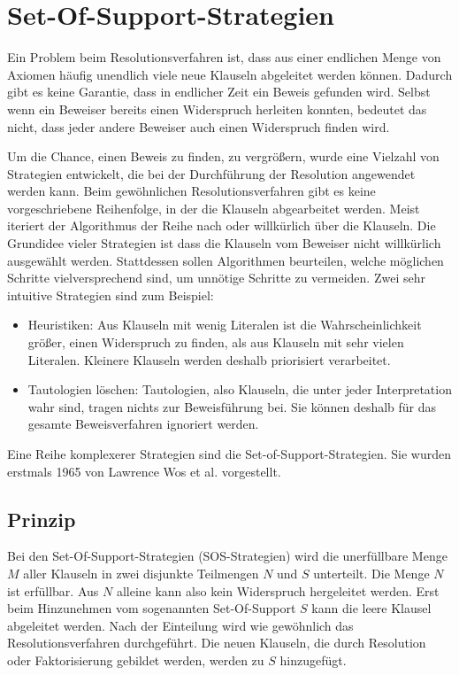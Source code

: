 	\section{Set-Of-Support-Strategien}
Ein Problem beim Resolutionsverfahren ist, dass aus einer endlichen Menge von Axiomen häufig unendlich viele neue Klauseln abgeleitet werden können. Dadurch gibt es keine Garantie, dass in endlicher Zeit ein Beweis gefunden wird. Selbst wenn ein Beweiser bereits einen Widerspruch herleiten konnten, bedeutet das nicht, dass jeder andere Beweiser auch einen Widerspruch finden wird.

Um die Chance, einen Beweis zu finden, zu vergrößern, wurde eine Vielzahl von Strategien entwickelt, die bei der Durchführung der Resolution angewendet werden kann. Beim gewöhnlichen Resolutionsverfahren gibt es keine vorgeschriebene Reihenfolge, in der die Klauseln abgearbeitet werden. Meist iteriert der Algorithmus der Reihe nach oder willkürlich über die Klauseln. Die Grundidee vieler Strategien ist dass die Klauseln vom Beweiser nicht willkürlich ausgewählt werden. Stattdessen sollen Algorithmen beurteilen, welche möglichen Schritte vielversprechend sind, um unnötige Schritte zu vermeiden. Zwei sehr intuitive Strategien sind zum Beispiel:
\begin{itemize}
	\item Heuristiken: Aus Klauseln mit wenig Literalen ist die Wahrscheinlichkeit größer, einen Widerspruch zu finden, als aus Klauseln mit sehr vielen Literalen. Kleinere Klauseln werden deshalb priorisiert verarbeitet.
	\item Tautologien löschen: Tautologien, also Klauseln, die unter jeder Interpretation wahr sind, tragen nichts zur Beweisführung bei. Sie können deshalb für das gesamte Beweisverfahren ignoriert werden.
\end{itemize}

Eine Reihe komplexerer Strategien sind die Set-of-Support-Strategien. Sie wurden erstmals 1965 von Lawrence Wos et al. vorgestellt. \cite{Wos1965Sos}

		\subsection{Prinzip}
Bei den Set-Of-Support-Strategien (SOS-Strategien) wird die unerfüllbare Menge $M$ aller Klauseln in zwei disjunkte Teilmengen $N$ und $S$ unterteilt. Die Menge $N$ ist erfüllbar. Aus $N$ alleine kann also kein Widerspruch hergeleitet werden. Erst beim Hinzunehmen vom sogenannten Set-Of-Support $S$ kann die leere Klausel abgeleitet werden. Nach der Einteilung wird wie gewöhnlich das Resolutionsverfahren durchgeführt. Die neuen Klauseln, die durch Resolution oder Faktorisierung gebildet werden, werden zu $S$ hinzugefügt. 

